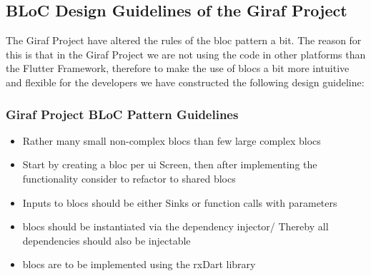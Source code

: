 \subsection{BLoC Design Guidelines of the Giraf Project}
The Giraf Project have altered the rules of the \gls{bloc} pattern a bit. The reason for this is that in the Giraf Project we are not using the code in other platforms than the Flutter Framework, therefore to make the use of \glspl{bloc} a bit more intuitive and flexible for the developers we have constructed the following design guideline:

\subsubsection{Giraf Project BLoC Pattern Guidelines}
\begin{itemize}
  \item Rather many small non-complex \glspl{bloc} than few large complex \glspl{bloc}
  \item Start by creating a \gls{bloc} per \gls{ui} Screen, then after implementing the functionality consider to refactor to shared \glspl{bloc}
  \item Inputs to \glspl{bloc} should be either Sinks or function calls with parameters
  \item \glspl{bloc} should be instantiated via the dependency injector/ Thereby all dependencies should also be injectable
  \item \glspl{bloc} are to be implemented using the rxDart library
\end{itemize}


